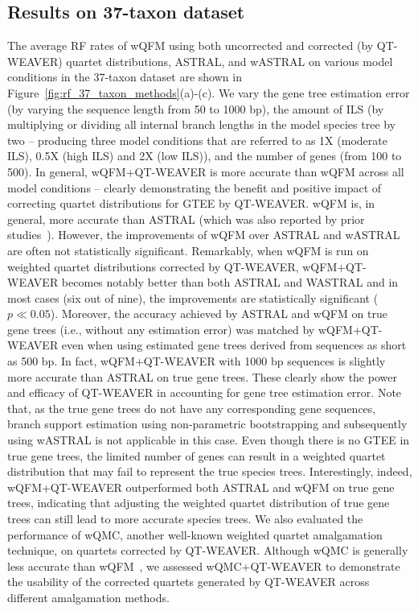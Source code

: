 \documentclass[10pt,a4paper]{article}
\begin{document}
\subsection{Results on 37-taxon dataset}
The average RF rates of wQFM using both uncorrected and corrected (by QT-WEAVER) quartet distributions, ASTRAL, and wASTRAL on various model conditions in the 37-taxon dataset are shown in Figure~\ref{fig:rf_37_taxon_methods}(a)-(c). %
We vary the gene tree estimation error (by varying the sequence length from 50 to 1000 bp), the amount of ILS (by multiplying or dividing all internal branch lengths in the model species tree by two -- producing three model conditions that are referred to as 1X (moderate ILS), 0.5X (high ILS) and 2X (low ILS)), and the number of genes (from 100 to 500). In general, wQFM+QT-WEAVER is more accurate than wQFM across all model conditions -- clearly demonstrating the benefit and positive impact of correcting quartet distributions for GTEE by QT-WEAVER. wQFM is, in general, more accurate than ASTRAL (which was also reported by prior studies~\cite{wqfm,mahbub2022qt}). However, the improvements of wQFM over ASTRAL and wASTRAL are often not statistically significant. Remarkably, when wQFM is run on weighted quartet distributions corrected by QT-WEAVER, wQFM+QT-WEAVER becomes notably better than both ASTRAL and WASTRAL and in most cases (six out of nine), the improvements are statistically significant ($p \ll 0.05$). Moreover, the accuracy achieved by ASTRAL and wQFM on true gene trees (i.e., without any estimation error) was matched by wQFM+QT-WEAVER even when using estimated gene trees derived from sequences as short as 500 bp. In fact, wQFM+QT-WEAVER with 1000 bp sequences is slightly more accurate than ASTRAL on true gene trees. These clearly show the power and efficacy of QT-WEAVER in accounting for gene tree estimation error. %
Note that, as the true gene trees do not have any corresponding gene sequences, branch support estimation using non-parametric bootstrapping and subsequently using wASTRAL is not applicable in this case. Even though there is no GTEE in true gene trees, the limited number of genes can result in a weighted quartet distribution that may fail to represent the true species trees. 
Interestingly, indeed, wQFM+QT-WEAVER outperformed both ASTRAL and wQFM on true gene trees, indicating that adjusting the weighted quartet distribution of true gene trees can still lead to more accurate species trees. We also evaluated the performance of wQMC, another well-known weighted quartet amalgamation technique, on quartets corrected by QT-WEAVER. Although wQMC is generally less accurate than wQFM~\cite{wqfm,mahbub2022qt}, we assessed wQMC+QT-WEAVER to demonstrate the usability of the corrected quartets generated by QT-WEAVER across different amalgamation methods. %
\end{document}
